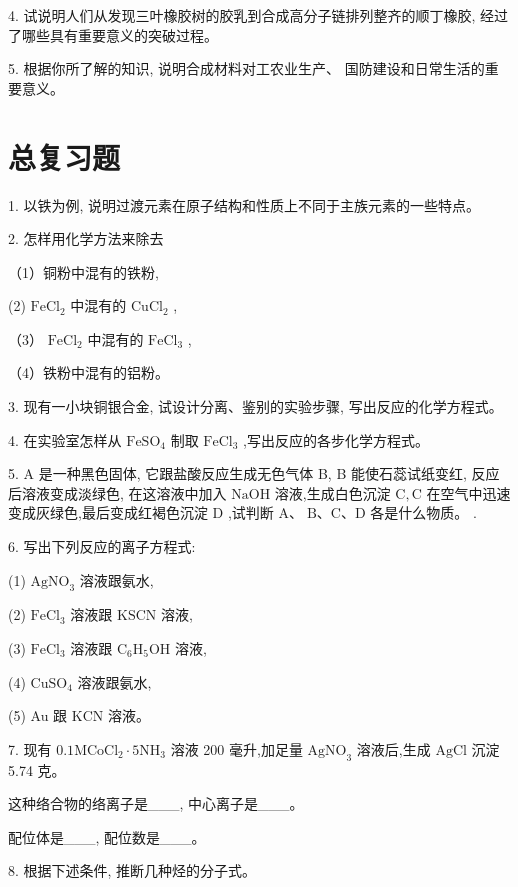 \documentclass[10pt]{article}
\begin{document}
4. 试说明人们从发现三叶橡胶树的胶乳到合成高分子链排列整齐的顺丁橡胶, 经过了哪些具有重要意义的突破过程。

5. 根据你所了解的知识, 说明合成材料对工农业生产、 国防建设和日常生活的重要意义。

\section*{总复习题}

1. 以铁为例, 说明过渡元素在原子结构和性质上不同于主族元素的一些特点。

2. 怎样用化学方法来除去

（1）铜粉中混有的铁粉,

(2) \({\mathrm{{FeCl}}}_{2}\) 中混有的 \({\mathrm{{CuCl}}}_{2}\) ,

（3） \({\mathrm{{FeCl}}}_{2}\) 中混有的 \({\mathrm{{FeCl}}}_{3}\) ,

（4）铁粉中混有的铝粉。

3. 现有一小块铜银合金, 试设计分离、鉴别的实验步骤, 写出反应的化学方程式。

4. 在实验室怎样从 \({\mathrm{{FeSO}}}_{4}\) 制取 \({\mathrm{{FeCl}}}_{3}\) ,写出反应的各步化学方程式。

5. A 是一种黑色固体, 它跟盐酸反应生成无色气体 B, B 能使石蕊试纸变红, 反应后溶液变成淡绿色, 在这溶液中加入 \(\mathrm{{NaOH}}\) 溶液,生成白色沉淀 \(\mathrm{C},\mathrm{C}\) 在空气中迅速变成灰绿色,最后变成红褐色沉淀 \(\mathrm{D}\) ,试判断 \(\mathrm{A}\text{、}\mathrm{\;B}\text{、}\mathrm{C}\text{、}\mathrm{D}\) 各是什么物质。 .

6. 写出下列反应的离子方程式:

(1) \({\mathrm{{AgNO}}}_{3}\) 溶液跟氨水,

(2) \({\mathrm{{FeCl}}}_{3}\) 溶液跟 \(\mathrm{{KSCN}}\) 溶液,

(3) \({\mathrm{{FeCl}}}_{3}\) 溶液跟 \({\mathrm{C}}_{6}{\mathrm{H}}_{5}\mathrm{{OH}}\) 溶液,

(4) \({\mathrm{{CuSO}}}_{4}\) 溶液跟氨水,

(5) Au 跟 \(\mathrm{{KCN}}\) 溶液。

7. 现有 \({0.1}\mathrm{M}{\mathrm{{CoCl}}}_{2} \cdot 5{\mathrm{{NH}}}_{3}\) 溶液 200 毫升,加足量 \({\mathrm{{AgNO}}}_{3}\) 溶液后,生成 \(\mathrm{{AgCl}}\) 沉淀 5.74 克。

这种络合物的络离子是\_\_\_, 中心离子是\_\_\_。

配位体是\_\_\_, 配位数是\_\_\_。

8. 根据下述条件, 推断几种烃的分子式。
\end{document}
